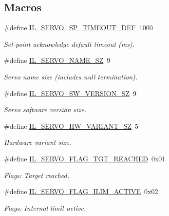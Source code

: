 \subsection*{Macros}
\begin{DoxyCompactItemize}
\item 
\#define \hyperlink{group__IL__SERVO_ga6c36d0853cb9bd4c71cee037421ec09a}{I\+L\+\_\+\+S\+E\+R\+V\+O\+\_\+\+S\+P\+\_\+\+T\+I\+M\+E\+O\+U\+T\+\_\+\+D\+EF}~1000
\begin{DoxyCompactList}\small\item\em Set-\/point acknowledge default timeout (ms). \end{DoxyCompactList}\item 
\#define \hyperlink{group__IL__SERVO_ga0a684ea427841d8ba4cf87b2d9a94d97}{I\+L\+\_\+\+S\+E\+R\+V\+O\+\_\+\+N\+A\+M\+E\+\_\+\+SZ}~9
\begin{DoxyCompactList}\small\item\em Servo name size (includes null termination). \end{DoxyCompactList}\item 
\#define \hyperlink{group__IL__SERVO_gaec19ad2892772d99664f16c55b9bc43f}{I\+L\+\_\+\+S\+E\+R\+V\+O\+\_\+\+S\+W\+\_\+\+V\+E\+R\+S\+I\+O\+N\+\_\+\+SZ}~9
\begin{DoxyCompactList}\small\item\em Servo software version size. \end{DoxyCompactList}\item 
\#define \hyperlink{group__IL__SERVO_ga18d9729ab800ffdda8ec81d8146a7e3f}{I\+L\+\_\+\+S\+E\+R\+V\+O\+\_\+\+H\+W\+\_\+\+V\+A\+R\+I\+A\+N\+T\+\_\+\+SZ}~5
\begin{DoxyCompactList}\small\item\em Hardware variant size. \end{DoxyCompactList}\item 
\#define \hyperlink{group__IL__SERVO_gaae195bbc7fd4c1d34122370e373a2fad}{I\+L\+\_\+\+S\+E\+R\+V\+O\+\_\+\+F\+L\+A\+G\+\_\+\+T\+G\+T\+\_\+\+R\+E\+A\+C\+H\+ED}~0x01
\begin{DoxyCompactList}\small\item\em Flags\+: Target reached. \end{DoxyCompactList}\item 
\#define \hyperlink{group__IL__SERVO_gac35b4c54f16936ff70f4e974a79fa586}{I\+L\+\_\+\+S\+E\+R\+V\+O\+\_\+\+F\+L\+A\+G\+\_\+\+I\+L\+I\+M\+\_\+\+A\+C\+T\+I\+VE}~0x02
\begin{DoxyCompactList}\small\item\em Flags\+: Internal limit active. \end{DoxyCompactList}\item 

\end{DoxyCompactItemize}
